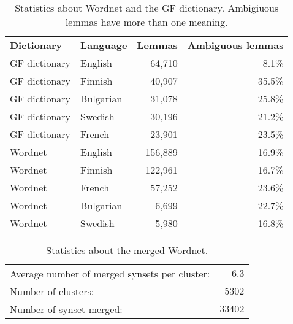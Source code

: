 \begin{table}[]
\centering
\begin{tabular}{llrr}
\textbf{Dictionary} & \textbf{Language} & \textbf{Lemmas} & \textbf{Ambiguous lemmas}\\
GF dictionary & English & 64,710 & 8.1\% \\
GF dictionary & Finnish & 40,907 & 35.5\% \\
GF dictionary & Bulgarian & 31,078 & 25.8\% \\
GF dictionary & Swedish & 30,196 & 21.2\% \\
GF dictionary & French & 23,901 & 23.5\% \\
Wordnet & English & 156,889 & 16.9\% \\
Wordnet & Finnish & 122,961 & 16.7\% \\
Wordnet & French  & 57,252 & 23.6\% \\
Wordnet & Bulgarian & 6,699 & 22.7\% \\
Wordnet & Swedish & 5,980 & 16.8\% \\
\end{tabular}

\caption{Statistics about Wordnet and the GF dictionary. Ambigiuous lemmas have more than one meaning.}
\label{tab:cluster_stats}
\end{table}


\begin{table}[]
\centering
\begin{tabular}{lr}
Average number of merged synsets per cluster: &$6.3$ \\
Number of clusters: & $5302$ \\
Number of synset merged: & $33402$ \\
\end{tabular}

\caption{Statistics about the merged Wordnet.}
\label{tab:cluster_stats}
\end{table}


